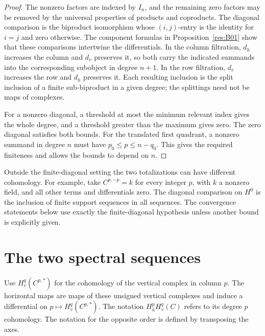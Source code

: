 \begin{proof}
The nonzero factors are indexed by \(I_n\), and the remaining zero factors
may be removed by the universal properties of products and coproducts.
The diagonal comparison is the biproduct isomorphism whose \((i,j)\)-entry
is the identity for \(i=j\) and zero otherwise. The component formulas in
Proposition~\ref{res:B01} show that these comparisons intertwine the
differentials. In the column filtration, \(d_h\) increases the column
and \(d_v\) preserves it, so both carry the indicated summands into the
corresponding subobject in degree \(n+1\). In the row filtration, \(d_v\)
increases the row and \(d_h\) preserves it. Each resulting inclusion is
the split inclusion of a finite sub-biproduct in a given degree; the
splittings need not be maps of complexes.

For a nonzero diagonal, a threshold at most the minimum relevant index
gives the whole degree, and a threshold greater than the maximum gives
zero. The zero diagonal satisfies both bounds. For the translated
first quadrant, a nonzero summand in degree \(n\) must have
\(p_0\le p\le n-q_0\). This gives the required finiteness and allows
the bounds to depend on \(n\).
\end{proof}

Outside the finite-diagonal setting the two totalizations can have
different cohomology. For example, take \(C^{p,-p}=k\) for every integer
\(p\), with \(k\) a nonzero field, and all other terms and differentials
zero. The diagonal comparison on \(H^0\) is the inclusion of finite
support sequences in all sequences. The convergence statements below
use exactly the finite-diagonal hypothesis unless another bound is
explicitly given.

\section{The two spectral sequences}

Use \(H_v^q(C^{p,*})\) for the cohomology of the vertical complex in
column \(p\). The horizontal maps are maps of these unsigned vertical
complexes and induce a differential on \(p\mapsto H_v^q(C^{p,*})\).
The notation \(H_h^p H_v^q(C)\) refers to its degree \(p\) cohomology.
The notation for the opposite order is defined by transposing the axes.

